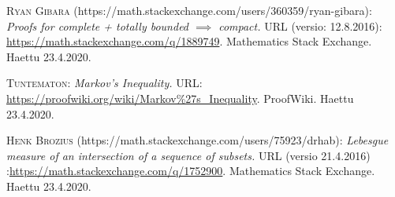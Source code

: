 \begin{thebibliography}{30}
\textsc{Ryan Gibara} (https://math.stackexchange.com/users/360359/ryan-gibara):
\textit{Proofs for complete + totally bounded $\implies$ compact.}
URL (versio: 12.8.2016): \url{https://math.stackexchange.com/q/1889749}.
Mathematics Stack Exchange. Haettu 23.4.2020.

\textsc{Tuntematon:} 
\textit{Markov's Inequality.}
URL: \url{https://proofwiki.org/wiki/Markov%27s_Inequality}.
ProofWiki. Haettu 23.4.2020.

\textsc{Henk Brozius} (https://math.stackexchange.com/users/75923/drhab):
\textit{Lebesgue measure of an intersection of a sequence of subsets.}
URL (versio 21.4.2016) :\url{https://math.stackexchange.com/q/1752900}.
Mathematics Stack Exchange. Haettu 23.4.2020.

\end{thebibliography}
